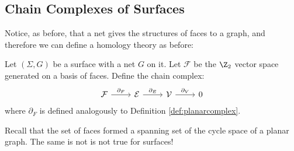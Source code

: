 \subsection{Chain Complexes of Surfaces}
Notice, as before, that a net gives the structures of faces to a graph, and therefore we can define a homology theory as before:
\begin{definition}
Let $(\Sigma, G)$ be a surface with a net $G$ on it. Let $\mathcal F$ be the $\Z_2$ vector space generated on a basis of faces. Define the chain complex: 
\[ \begin{tikzcd}
\mathcal F \arrow{r}{\partial_F} & \mathcal E \arrow{r}{\partial_E} & \mathcal V  \arrow{r}{\partial_V} & 0
\end{tikzcd}\]
where $\partial_F$ is defined analogously to Definition \ref{def:planarcomplex}. \label{def:surfacecomplex}
\end{definition}
Recall that the set of faces formed a spanning set of the cycle space of a planar graph. The same is not is not true for surfaces! \\


